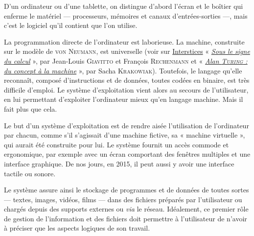 D’un ordinateur ou d’une tablette, on distingue d’abord l’écran et le boîtier qui enferme le matériel --- processeurs, mémoires et canaux d’entrées-sorties ---, mais c’est le logiciel qu’il contient que l’on utilise.

La programmation directe de l’ordinateur est laborieuse. La machine, construite sur le modèle de \textsc{von Neumann}, est universelle (voir sur \href{https://interstices.info/}{Interstices} « \href{https://interstices.info/sous-le-signe-du-calcul/}{\textit{Sous le signe du calcul}} », par Jean-Louis \textsc{Giavitto} et François \textsc{Rechenmann} et « \href{https://interstices.info/alan-turing-du-concept-a-la-machine/}{\textit{Alan \textsc{Turing} : du concept à la machine}} », par Sacha \textsc{Krakowiak}). Toutefois, le langage qu’elle reconnaît, composé d’instructions et de données, toutes codées en binaire, est très difficile d’emploi. Le système d’exploitation vient alors au secours de l’utilisateur, en lui permettant d’exploiter l’ordinateur mieux qu’en langage machine. Mais il fait plus que cela.


Le but d’un système d’exploitation est de rendre aisée l’utilisation de l’ordinateur par chacun, comme s’il s’agissait d’une machine fictive, sa « machine virtuelle », qui aurait été construite pour lui. Le système fournit un accès commode et ergonomique, par exemple avec un écran comportant des fenêtres multiples et une interface graphique. De nos jours, en 2015, il peut aussi y avoir une interface tactile ou sonore.\nopagebreak

Le système assure ainsi le stockage de programmes et de données de toutes sortes --- textes, images, vidéos, films --- \pagebreak dans des fichiers préparés par l’utilisateur ou chargés depuis des supports externes ou \textit{via} le réseau. Idéalement, ce premier rôle de gestion de l’information et des fichiers doit permettre à l’utilisateur de n’avoir à préciser que les aspects logiques de son travail.

